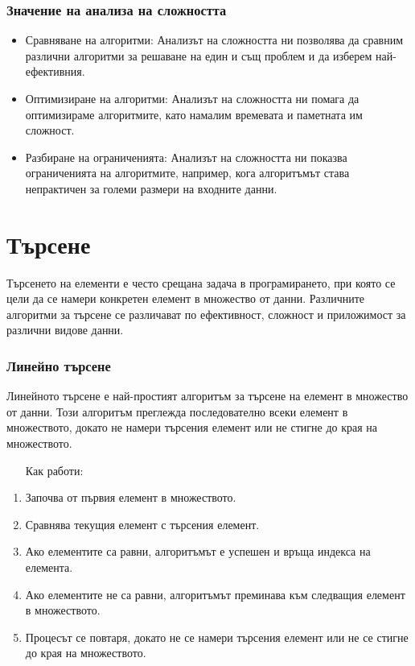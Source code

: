 \documentclass[oneside]{book}
\begin{document}
\subsubsection{Значение на анализа на сложността}
\begin{itemize}
    \item Сравняване на алгоритми: Анализът на сложността ни позволява да сравним различни алгоритми за решаване на един и същ проблем и да изберем най-ефективния.
    \item Оптимизиране на алгоритми: Анализът на сложността ни помага да оптимизираме алгоритмите, като намалим времевата и паметната им сложност.
    \item Разбиране на ограниченията: Анализът на сложността ни показва ограниченията на алгоритмите, например, кога алгоритъмът става непрактичен за големи размери на входните данни.
\end{itemize}

\pagebreak
\section{Търсене}
Търсенето на елементи е често срещана задача в програмирането, при която се цели да се намери конкретен елемент в множество от данни. Различните алгоритми за търсене се различават по ефективност, сложност и приложимост за различни видове данни.

\subsubsection{Линейно търсене}
Линейното търсене е най-простият алгоритъм за търсене на елемент в множество от данни. Този алгоритъм преглежда последователно всеки елемент в множеството, докато не намери търсения елемент или не стигне до края на множеството.

\begin{enumerate}\item[Как работи:]\end{enumerate}
\begin{enumerate}
    \item Започва от първия елемент в множеството.
    \item Сравнява текущия елемент с търсения елемент.
    \item Ако елементите са равни, алгоритъмът е успешен и връща индекса на елемента.
    \item Ако елементите не са равни, алгоритъмът преминава към следващия елемент в множеството.
    \item Процесът се повтаря, докато не се намери търсения елемент или не се стигне до края на множеството.
\end{enumerate}
\end{document}

